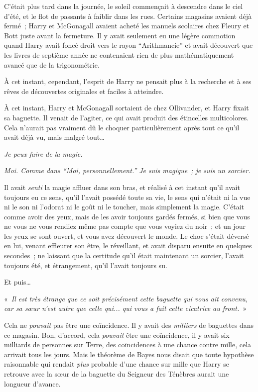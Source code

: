 \later

C'était plus tard dans la journée, le soleil commençait à descendre dans le ciel d'été, et le flot de passants à faiblir dans les rues.
Certains magasins avaient déjà fermé~; Harry et McGonagall avaient acheté les manuels scolaires chez Fleury et Bott juste avant la fermeture.
Il y avait seulement eu une légère commotion quand Harry avait foncé droit vers le rayon “Arithmancie” et avait découvert que les livres de septième année ne contenaient rien de plus mathématiquement avancé que de la trigonométrie.

À cet instant, cependant, l'esprit de Harry ne pensait plus à la recherche et à ses rêves de découvertes originales et faciles à atteindre.

À cet instant, Harry et McGonagall sortaient de chez Ollivander, et Harry fixait sa baguette.
Il venait de l'agiter, ce qui avait produit des étincelles multicolores.
Cela n'aurait pas vraiment dû le choquer particulièrement après tout ce qu'il avait déjà vu, mais malgré tout…

\emph{Je peux faire de la magie.}

\emph{Moi. Comme dans “Moi, personnellement.” Je suis magique~; je suis un sorcier.}

Il avait \emph{senti} la magie affluer dans son bras, et réalisé à cet instant qu'il avait toujours eu ce sens, qu'il l'avait possédé toute sa vie, le sens qui n'était ni la vue ni le son ni l'odorat ni le goût ni le toucher, mais simplement la magie.
C'était comme avoir des yeux, mais de les avoir toujours gardés fermés, si bien que vous ne vous ne vous rendiez même pas compte que vous voyiez du noir~;
et un jour les yeux se sont ouvert, et vous avez découvert le monde.
Le choc s'était déversé en lui, venant effleurer son être, le réveillant, et avait disparu ensuite en quelques secondes~;
ne laissant que la certitude qu'il était maintenant un sorcier, l'avait toujours été,
et étrangement, qu'il l'avait toujours su.

Et puis…

«~\emph{Il est très étrange que ce soit précisément cette baguette qui vous ait convenu, car sa sœur n'est autre que celle qui... qui vous a fait cette cicatrice au front.}~»

Cela ne \emph{pouvait} pas être une coïncidence.
Il y avait des \emph{milliers} de baguettes dans ce magasin.
Bon, d'accord, cela \emph{pouvait} être une coïncidence, il y avait six milliards de personnes sur Terre, des coïncidences à une chance contre mille, cela arrivait tous les jours.
Mais le théorème de Bayes nous disait que toute hypothèse raisonnable
qui rendait \emph{plus} probable d'une chance sur mille que Harry se retrouve avec la sœur de la baguette du Seigneur des Ténèbres aurait une longueur d'avance.


